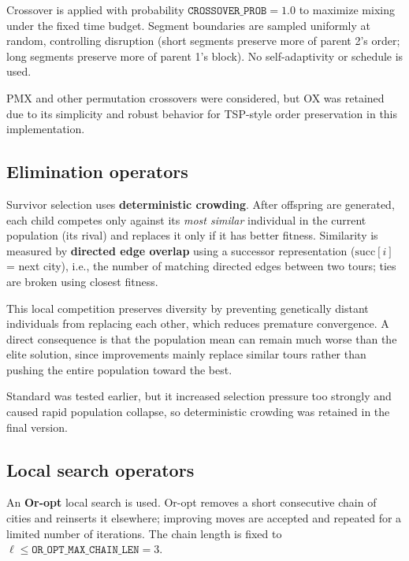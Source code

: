 \documentclass[a4paper,10pt]{article}
\begin{document}
Crossover is applied with probability $\texttt{CROSSOVER\_PROB}=1.0$ to maximize mixing under the fixed time
budget. Segment boundaries are sampled uniformly at random, controlling disruption (short segments preserve more
of parent 2's order; long segments preserve more of parent 1's block). No self-adaptivity or schedule is used.

PMX and other permutation crossovers were considered, but OX was retained due to its simplicity and robust
behavior for TSP-style order preservation in this implementation.



\subsection{Elimination operators}

Survivor selection uses \textbf{deterministic crowding}. After offspring are generated, each child competes only
against its \emph{most similar} individual in the current population (its rival) and replaces it only if it has
better fitness. Similarity is measured by \textbf{directed edge overlap} using a successor representation
($\mathrm{succ}[i]$ = next city), i.e., the number of matching directed edges between two tours; ties are broken
using closest fitness.

This local competition preserves diversity by preventing genetically distant individuals from replacing each
other, which reduces premature convergence. A direct consequence is that the population mean can remain much
worse than the elite solution, since improvements mainly replace similar tours rather than pushing the entire
population toward the best.

Standard  was tested earlier, but it increased selection pressure too strongly
and caused rapid population collapse, so deterministic crowding was retained in the final version.



\subsection{Local search operators}

An \textbf{Or-opt} local search is used. Or-opt removes a short consecutive chain of cities and reinserts it
elsewhere; improving moves are accepted and repeated for a limited number of iterations. The chain length is
fixed to $\ell \leq \texttt{OR\_OPT\_MAX\_CHAIN\_LEN}=3$.
\end{document}
